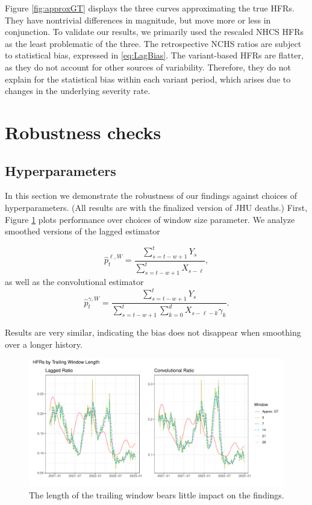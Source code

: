 \documentclass{article}
\begin{document}
Figure \ref{fig:approxGT} displays the three curves approximating the true HFRs. They have nontrivial differences in magnitude, but move more or less in conjunction. To validate our results, we primarily used the rescaled NHCS HFRs as the least problematic of the three. The retrospective NCHS ratios are subject to statistical bias, expressed in \ref{eq:LagBias}. The variant-based HFRs are flatter, as they do not account for other sources of variability. Therefore, they do not explain for the statistical bias within each variant period, which arises due to changes in the underlying severity rate.  %

\section{Robustness checks}\label{apx:robustness}
\subsection{Hyperparameters}
In this section we demonstrate the robustness of our findings against choices of hyperparameters. (All results are with the finalized version of JHU deaths.) First, Figure \ref{fig:window} plots performance over choices of window size parameter. We analyze smoothed versions of the lagged estimator

\begin{equation}\label{eq:laggedSmooth}
    \hat{p}_t^{\ell, W} = \frac{\sum_{s=t-w+1}^{t} Y_s}{\sum_{s=t-w+1}^{t} X_{s-\ell}},
\end{equation}
\noindent as well as the convolutional estimator
\begin{equation}\label{eq:convSmooth}
    \hat{p}_t^{\gamma, W} = \frac{\sum_{s=t-w+1}^{t} Y_s}{\sum_{s=t-w+1}^{t} \sum_{k=0}^d X_{s-\ell-k}\gamma_k}.
\end{equation}

\noindent Results are very similar, indicating the bias does not disappear when smoothing over a longer history. 

\begin{figure}
    \centering
    \includegraphics[width=0.75\linewidth]{Figs/Real/window_size.pdf}
    \caption{The length of the trailing window bears little impact on the findings.}
    \label{fig:window}
\end{figure}
\end{document}
